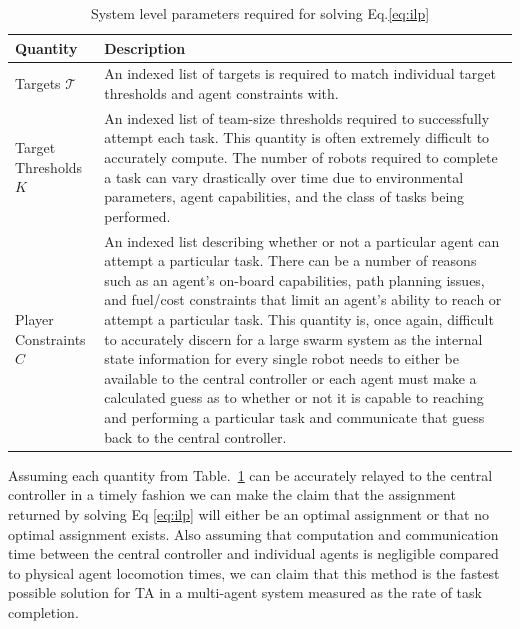 \documentclass[11pt, onecolumn, compsoc, letterpaper]{article}
\newcommand{\Ta}{\mathcal{T}} %
\begin{document}
\begin{table}[!ht]
\centering\begin{tabular}{|l|p{}|}
\hline
\textbf{Quantity} & \textbf{Description}\\\hline
Targets $\Ta$ & An indexed list of targets is required to match individual target thresholds and agent constraints with.\\\hline
Target Thresholds $K$ & An indexed list of team-size thresholds required to successfully attempt each task. This quantity is often extremely difficult to accurately compute. The number of robots required to complete a task can vary drastically over time due to environmental parameters, agent capabilities, and the class of tasks being performed.\\\hline
Player Constraints $C$ & An indexed list describing whether or not a particular agent can attempt a particular task. There can be a number of reasons such as an agent's on-board capabilities, path planning issues, and fuel/cost constraints that limit an agent's ability to reach or attempt a particular task. This quantity is, once again, difficult to accurately discern for a large swarm system as the internal state information for every single robot needs to either be available to the central controller or each agent must make a calculated guess as to whether or not it is capable to reaching and performing a particular task and communicate that guess back to the central controller.\\\hline 
\end{tabular}
\centering\caption{System level parameters required for solving Eq.\eqref{eq:ilp}}\label{tab:ilpquants}
\end{table}

Assuming each quantity from Table.~\ref{tab:ilpquants} can be accurately relayed to the central controller in a timely fashion we can make the claim that the assignment returned by solving Eq \eqref{eq:ilp} will either be an optimal assignment or that no optimal assignment exists. Also assuming that computation and communication time between the central controller and individual agents is negligible compared to physical agent locomotion times, we can claim that this method is the fastest possible solution for TA in a multi-agent system measured as the rate of task completion.
\end{document}
